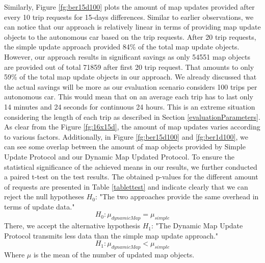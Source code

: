 Similarly, Figure \ref{fg:ber15d100} plots the amount of map updates provided after every 10 trip requests for 15-days differences. Similar to earlier observations, we can notice that our approach is relatively linear in terms of providing map update objects to the autonomous car based on the trip requests. After 20 trip requests, the simple update approach provided 84\% of the total map update objects. However, our approach results in significant savings as only 54551 map objects are provided out of total 71859 after first 20 trip request. That amounts to only 59\% of the total map update objects in our approach. We already discussed that the actual savings will be more as our evaluation scenario considers 100 trips per autonomous car. This would mean that on an average each trip has to last only 14 minutes and 24 seconds for continuous 24 hours. This is an extreme situation considering the length of each trip as described in Section \ref{evaluationParameters}.  \\


As clear from the Figure \ref{fg:16x15d}, the amount of map updates varies according to various factors. Additionally, in Figure \ref{fg:ber15d100} and \ref{fg:ber1d100}, we can see some overlap between the amount of map objects provided by Simple Update Protocol and our Dynamic Map Updated Protocol. 
To ensure the statistical significance of the achieved means in our results, we further conducted a paired t-test on the test results. The obtained p-values for the different amount of requests are presented in Table \ref{tablettest} and indicate clearly that we can reject the null hypotheses $H_{0}$: "The two approaches provide the same overhead in terms of update data."
\begin{equation}
H_0: \mu_{dynamicMap} = \mu_{simple}
\end{equation} 
There, we accept the alternative hypothesis  $H_1$: "The Dynamic Map Update Protocol transmits less data than the simple map update approach." 
\begin{equation}
H_1: \mu_{dynamicMap} < \mu_{simple}
\end{equation}
Where $\mu$ is the mean of the number of updated map objects.\\ 


